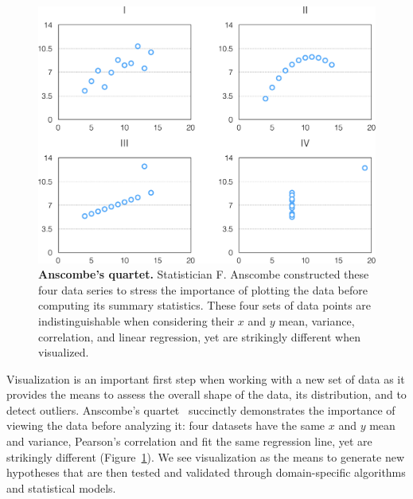 \begin{figure}[ht]
  \centering
  \includegraphics[width=0.8\linewidth]{figures/anscombes_quartet}
  \caption{\textbf{Anscombe's quartet.} Statistician F. Anscombe constructed these four data series to stress the importance of plotting the data before computing its summary statistics. These four sets of data points are indistinguishable when considering their $x$ and $y$ mean, variance, correlation, and linear regression, yet are strikingly different when visualized.}
  \label{fig:intro:anscombe}
\end{figure}


Visualization is an important first step when working with a new set of data as it provides the means to assess the overall shape of the data, its distribution, and to detect outliers. Anscombe's quartet~\cite{anscombe} succinctly demonstrates the importance of viewing the data before analyzing it: four datasets have the same $x$ and $y$ mean and variance, Pearson's correlation and fit the same regression line, yet are strikingly different (Figure~\ref{fig:intro:anscombe}). We see visualization as the means to generate new hypotheses that are then tested and validated through domain-specific algorithms and statistical models.